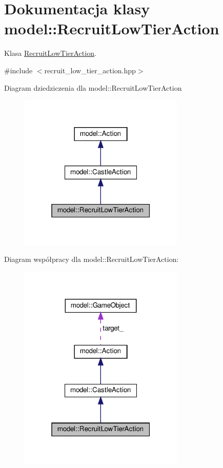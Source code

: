 \hypertarget{classmodel_1_1RecruitLowTierAction}{}\section{Dokumentacja klasy model\+:\+:Recruit\+Low\+Tier\+Action}
\label{classmodel_1_1RecruitLowTierAction}


Klasa \hyperlink{classmodel_1_1RecruitLowTierAction}{Recruit\+Low\+Tier\+Action}.  




{\ttfamily \#include $<$recruit\+\_\+low\+\_\+tier\+\_\+action.\+hpp$>$}



Diagram dziedziczenia dla model\+:\+:Recruit\+Low\+Tier\+Action\nopagebreak
\begin{figure}[H]
\begin{center}
\leavevmode
\includegraphics[width=223pt]{classmodel_1_1RecruitLowTierAction__inherit__graph}
\end{center}
\end{figure}


Diagram współpracy dla model\+:\+:Recruit\+Low\+Tier\+Action\+:\nopagebreak
\begin{figure}[H]
\begin{center}
\leavevmode
\includegraphics[width=223pt]{classmodel_1_1RecruitLowTierAction__coll__graph}
\end{center}
\end{figure}
